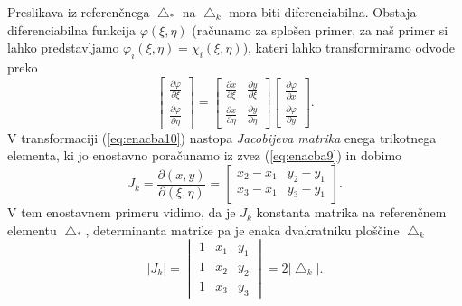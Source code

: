 \documentclass[12pt,a4paper]{article}
\begin{document}
Preslikava iz referenčnega $\bigtriangleup _*$ na $\bigtriangleup _k$ mora biti diferenciabilna. Obstaja diferenciabilna funkcija $\varphi (\xi, \eta)$ (računamo za splošen primer, za naš primer si lahko predstavljamo $\varphi_i (\xi, \eta) = \chi _i(\xi, \eta) $), kateri lahko transformiramo odvode preko
\begin{equation} \label{eq:enacba10}
\begin{bmatrix}
 \frac{ \partial \varphi}{\partial \xi}\\ 
\frac{\partial \varphi}{\partial \eta }
\end{bmatrix} = 
\begin{bmatrix}
 \frac{\partial x}{ \partial \xi}& \frac{\partial y}{ \partial \xi}\\ 
 \frac{\partial x}{ \partial \eta}& \frac{\partial y}{ \partial \eta} 
\end{bmatrix}
\begin{bmatrix}
 \frac{ \partial \varphi}{\partial x}\\ 
\frac{\partial \varphi}{\partial y }
\end{bmatrix}.
\end{equation}
V transformaciji (\ref{eq:enacba10}) nastopa \textit{Jacobijeva matrika} enega trikotnega elementa, ki jo enostavno poračunamo iz zvez (\ref{eq:enacba9}) in dobimo
\begin{equation}
J_k = \frac{\partial(x,y)}{\partial (\xi,\eta)}=
\begin{bmatrix}
x_2-x_1 & y_2 -y_1 \\
x_3 -x_1 & y_3 -y_1
\end{bmatrix}.
\end{equation}
V tem enostavnem primeru vidimo, da je $J_k$ konstanta matrika na referenčnem elementu $\bigtriangleup _*$, determinanta matrike pa je enaka dvakratniku ploščine $\bigtriangleup _k$
\begin{equation}
|J_k|=\begin{vmatrix}
 1& x_1 &y_1 \\ 
 1& x_2 & y_2\\ 
 1& x_3 & y_3
\end{vmatrix} = 2| \bigtriangleup _k|.
\end{equation}
\end{document}

